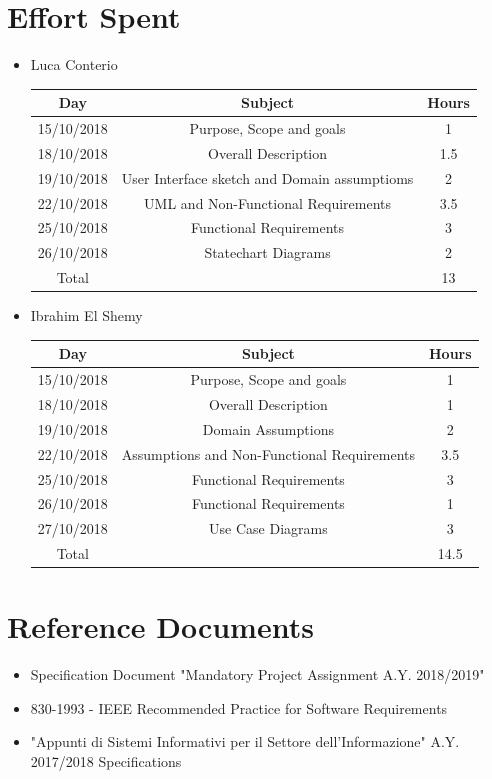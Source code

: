 \documentclass[12pt,a4paper]{article}
\begin{document}
	\section{Effort Spent}
	\begin{itemize}
		\item Luca Conterio
		\begin{center}
			\begin{tabular}{| c | c | c |}
				\hline
				Day & Subject & Hours \\ \hline
				15/10/2018 & Purpose, Scope and goals & 1 \\
				18/10/2018 & Overall Description & 1.5 \\
				19/10/2018  & User Interface sketch and Domain assumptioms & 2 \\
				22/10/2018  & UML and Non-Functional Requirements & 3.5 \\
				25/10/2018 & Functional Requirements & 3 \\
				26/10/2018 & Statechart Diagrams & 2 \\
				\hline
				Total & & 13\\
				\hline
			\end{tabular}
		\end{center}
		
		\item Ibrahim El Shemy
		\begin{center}
			\begin{tabular}{| c | c | c |}
				\hline
				Day & Subject & Hours \\ \hline
				15/10/2018 & Purpose, Scope and goals & 1 \\
				18/10/2018 & Overall Description & 1 \\
				19/10/2018  & Domain Assumptions & 2 \\
				22/10/2018  & Assumptions and Non-Functional Requirements & 3.5 \\
				25/10/2018 & Functional Requirements & 3 \\
				26/10/2018 & Functional Requirements & 1 \\
				27/10/2018 & Use Case Diagrams & 3 \\
				\hline
				Total & & 14.5\\
				\hline
			\end{tabular}
		\end{center}
	\end{itemize}
	\section{Reference Documents}
	\begin{itemize}
		\item Specification Document "Mandatory Project Assignment A.Y. 2018/2019"
		\item 830-1993 - IEEE Recommended Practice for Software Requirements
		\item "Appunti di Sistemi Informativi per il Settore dell'Informazione" A.Y. 2017/2018
		Specifications
	\end{itemize}
\end{document}
